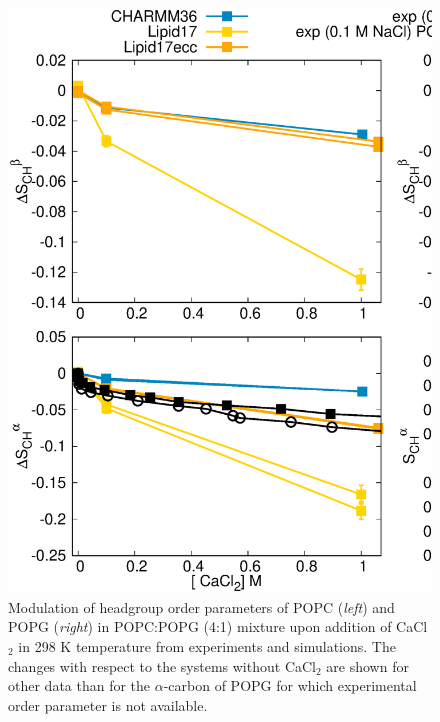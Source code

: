 \documentclass[journal=jpcbfk]{achemso}
\begin{document}
\begin{figure}[]
  \centering
  \includegraphics[width=18.0cm]{./Figs/CHANGESwithCaClPG1PC4.eps}
  \caption{\label{changesWITHCaClPG1PC4}
    Modulation of headgroup order parameters of POPC ({\it left}) and POPG ({\it right}) in POPC:POPG (4:1)
    mixture upon addition of CaCl$_2$ in 298 K temperature from experiments \cite{macdonald87} and simulations.
    The changes with respect to the systems without CaCl$_2$ are shown for other data than
    for the $\alpha$-carbon of POPG for which experimental order parameter is not available.
  }
\end{figure}
\end{document}
